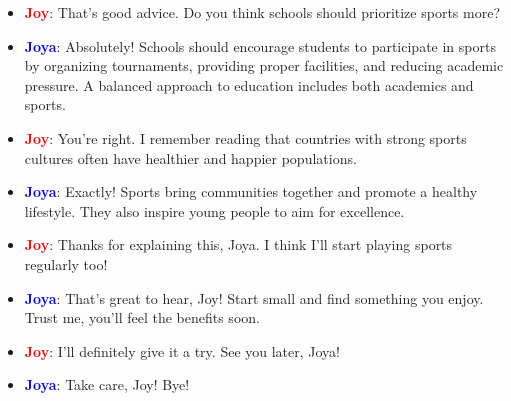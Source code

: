 \documentclass{article}
\begin{document}
\begin{itemize}
    \item \textbf{\textcolor{red}{Joy}}: That’s good advice. Do you think schools should prioritize sports more?
    \item \textbf{\textcolor{blue}{Joya}}: Absolutely! Schools should encourage students to participate in sports by organizing tournaments, providing proper facilities, and reducing academic pressure. A balanced approach to education includes both academics and sports.
    \item \textbf{\textcolor{red}{Joy}}: You’re right. I remember reading that countries with strong sports cultures often have healthier and happier populations.
    \item \textbf{\textcolor{blue}{Joya}}: Exactly! Sports bring communities together and promote a healthy lifestyle. They also inspire young people to aim for excellence.
    \item \textbf{\textcolor{red}{Joy}}: Thanks for explaining this, Joya. I think I’ll start playing sports regularly too!
    \item \textbf{\textcolor{blue}{Joya}}: That’s great to hear, Joy! Start small and find something you enjoy. Trust me, you’ll feel the benefits soon.
    \item \textbf{\textcolor{red}{Joy}}: I’ll definitely give it a try. See you later, Joya!
    \item \textbf{\textcolor{blue}{Joya}}: Take care, Joy! Bye!
\end{itemize}
\end{document}

